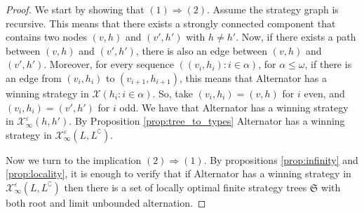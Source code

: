 \begin{proof}
We start by showing that $(1) \Rightarrow (2)$. Assume the strategy graph is recursive. This means that there exists a strongly connected component that contains two nodes $(v, h)$ and $(v', h')$ with $h \neq h'$. 
Now, if there exists a path between $(v, h)$ and $(v', h')$, there is also an edge between $(v, h)$ and $(v', h')$. 
Moreover, for every sequence $((v_i,h_i) : i \in \alpha)$, for $\alpha \leq \omega$, if there is an edge from $(v_i, h_i)$ to $(v_{i+1}, h_{i+1})$, this means that Alternator has a winning strategy in $\mathcal{X}(h_i: i \in \alpha)$. So, take $(v_i, h_i)= (v,h)$ for $i$ even, and $(v_i, h_i)= (v',h')$ for $i$ odd. We have that Alternator has a winning strategy in $\mathcal{X}^\varepsilon_\infty(h, h')$. By Proposition \ref{prop:tree_to_types}
Alternator has a winning strategy in  $\mathcal{X}^\varepsilon_\infty(L, L^\complement)$.


Now we turn to the implication  $(2) \Rightarrow (1)$. 
By propositions \ref{prop:infinity}  and \ref{prop:locality}, it is enough to verify that 
 if Alternator has a winning strategy in $\mathcal{X}^\varepsilon_\infty(L, L^\complement)$ then there is a set of locally optimal finite strategy trees $\mathfrak{S}$ with both root and limit unbounded alternation. 
 

\end{proof}

